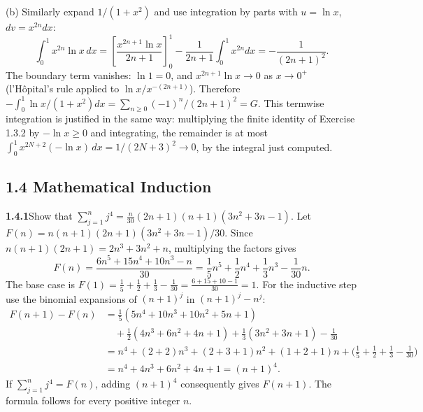 (b) Similarly expand $1/(1+x^2)$ and use integration by parts with
$u=\ln x$, $dv=x^{2n}dx$:
\[
 \int_0^1x^{2n}\ln x\,dx
 =\left[\frac{x^{2n+1}\ln x}{2n+1}\right]_0^1
   -\frac1{2n+1}\int_0^1x^{2n}dx
 =-\frac1{(2n+1)^2}.
\]
The boundary term vanishes: $\ln1=0$, and $x^{2n+1}\ln x\to0$ as
$x\to0^+$ (l'H\^opital's rule applied to $\ln x/x^{-(2n+1)}$).
Therefore $-\int_0^1\ln x/(1+x^2)dx=\sum_{n\ge0}(-1)^n/(2n+1)^2=G$.
This termwise integration is justified in the same way: multiplying the
finite identity of Exercise 1.3.2 by $-\ln x\ge0$ and integrating, the
remainder is at most $\int_0^1x^{2N+2}(-\ln x)\,dx=1/(2N+3)^2\to0$, by
the integral just computed.


\subsection*{1.4 Mathematical Induction}

\par\bigskip
\noindent\textbf{1.4.1}\quad Show that
$\displaystyle\sum_{j=1}^{n}j^{4}=\frac{n}{30}(2n+1)(n+1)(3n^{2}+3n-1)$.
\solution
Let $F(n)=n(n+1)(2n+1)(3n^2+3n-1)/30$. Since
$n(n+1)(2n+1)=2n^3+3n^2+n$, multiplying the factors gives
\[
 F(n)=\frac{6n^5+15n^4+10n^3-n}{30}
     =\frac15n^5+\frac12n^4+\frac13n^3-\frac1{30}n.
\]
The base case is $F(1)=\frac15+\frac12+\frac13-\frac1{30}
=\frac{6+15+10-1}{30}=1$. For the inductive step use the binomial
expansions of $(n+1)^j$ in $(n+1)^j-n^j$:
\[
 \begin{aligned}
 F(n+1)-F(n)
 &=\tfrac15(5n^4+10n^3+10n^2+5n+1)\\
 &\quad+\tfrac12(4n^3+6n^2+4n+1)
       +\tfrac13(3n^2+3n+1)-\tfrac1{30}\\
 &=n^4+(2+2)n^3+(2+3+1)n^2+(1+2+1)n
   +\bigl(\tfrac15+\tfrac12+\tfrac13-\tfrac1{30}\bigr)\\
 &=n^4+4n^3+6n^2+4n+1=(n+1)^4.
 \end{aligned}
\]
If $\sum_{j=1}^n j^4=F(n)$, adding $(n+1)^4$ consequently gives
$F(n+1)$. The formula follows for every positive integer $n$.


